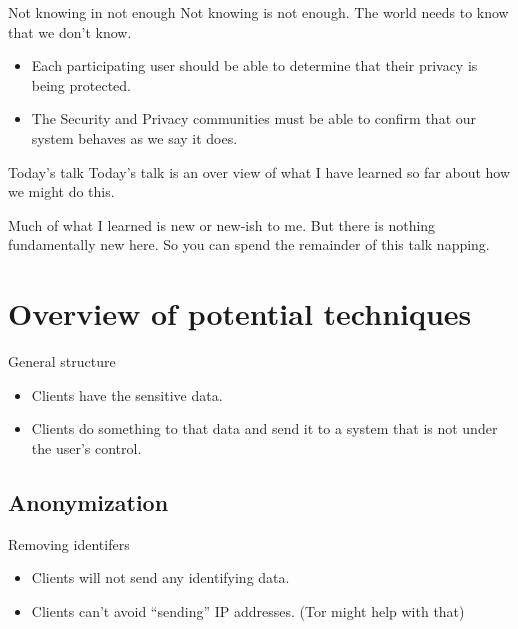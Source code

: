 \documentclass[xcolor={dvipsnames,table,hyperref}]{beamer}
\begin{document}
\begin{frame}{Not knowing in not enough}
  Not knowing is not enough. The world needs to know that we don't know.
  \begin{itemize}
    \item Each participating user should be able to determine that their privacy is being protected.
    \item The Security and Privacy communities must be able to confirm that our system behaves as we say it does.
  \end{itemize}

\end{frame}

\begin{frame}{Today's talk}
  Today's talk is an over view of what I have learned so far about how we might do this.

  Much of what I learned is new or new-ish to me. But there is nothing fundamentally new here. So you can spend the remainder of this talk napping.

\end{frame}

\section{Overview of potential techniques}

\begin{frame}{General structure}
  \begin{itemize}
    \item Clients have the sensitive data.
    \item Clients do something to that data and send it to a system that is not under the user's control.
  \end{itemize}
\end{frame}

\subsection{Anonymization}

\begin{frame}{Removing identifers}
  \begin{itemize}
    \item Clients will not send any identifying data.
    \item Clients can't avoid “sending” IP addresses. (Tor might help with that)
  \end{itemize}
\end{frame}
\end{document}
